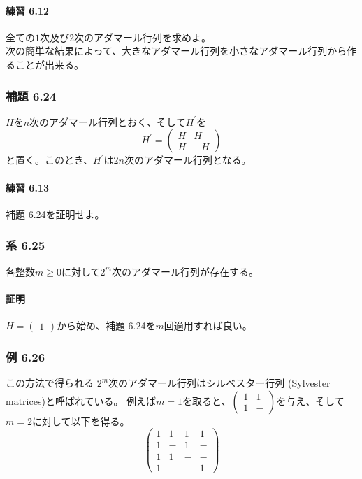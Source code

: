 \documentclass[12pt,a4paper]{article}
\begin{document}
      \paragraph{練習 6.12}
        全ての$1$次及び$2$次のアダマール行列を求めよ。 \\

    次の簡単な結果によって、大きなアダマール行列を小さなアダマール行列から作ることが出来る。

    \subsubsection*{補題 6.24}
      $H$を$n$次のアダマール行列とおく、そして$H^\prime$を
      \[H^\prime = \begin{pmatrix} H & H \\ H & -H\end{pmatrix}\]
      と置く。このとき、$H^\prime$は$2n$次のアダマール行列となる。

      \paragraph{練習 6.13}
        補題 6.24を証明せよ。

    \subsubsection*{系 6.25}
      各整数$m \geq 0$に対して$2^m$次のアダマール行列が存在する。
      
      \paragraph{証明}
        $H = \begin{pmatrix}  1\end{pmatrix}$から始め、補題 6.24を$m$回適用すれば良い。

    \subsubsection*{例 6.26}
      この方法で得られる $2^m$次のアダマール行列はシルベスター行列 (Sylvester matrices)と呼ばれている。
      例えば$m = 1$を取ると、$\begin{pmatrix} 1 & 1 \\ 1 & - \end{pmatrix}$を与え、そして$m = 2$に対して以下を得る。
      \[ \begin{pmatrix}
          1 & 1 & 1 & 1 \\
          1 & - & 1 & - \\
          1 & 1 & - & - \\
          1 & - & - & 1
      \end{pmatrix} \]
\end{document}
